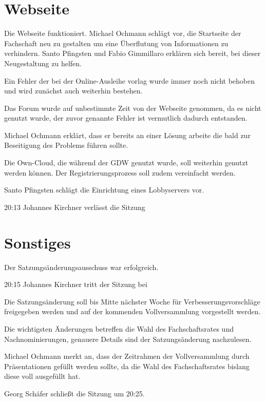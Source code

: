 \documentclass[a4paper, 11pt]{article} %
\begin{document}
\section{Webseite}
Die Webseite funktioniert.
Michael Ochmann schlägt vor, die Startseite der Fachschaft neu zu gestalten um eine Überflutung von Informationen zu verhindern. Santo Pfingsten und Fabio Gimmillaro erklären sich bereit, bei dieser Neugestaltung zu helfen.

Ein Fehler der bei der Online-Ausleihe vorlag wurde immer noch nicht behoben und wird zunächst auch weiterhin bestehen.

Das Forum wurde auf unbestimmte Zeit  von der Webseite genommen, da es nicht genutzt wurde, der zuvor genannte Fehler ist vermutlich dadurch entstanden.

Michael Ochmann erklärt, dass er bereits an einer Lösung arbeite die bald zur Beseitigung des Problems führen sollte.

Die Own-Cloud, die während der GDW genutzt wurde, soll weiterhin genutzt werden können.  Der Registrierungsprozess soll zudem vereinfacht werden.

Santo Pfingsten schlägt die Einrichtung eines Lobbyservers vor.

20:13 Johannes Kirchner verlässt die Sitzung
\pagebreak
\section{Sonstiges}

Der Satzungsänderungsausschuss war erfolgreich.

20:15 Johannes Kirchner tritt der Sitzung bei

Die Satzungsänderung soll bis  Mitte nächster Woche für Verbesserungsvorschläge freigegeben werden und auf der kommenden Vollversammlung vorgestellt werden.

Die wichtigsten Änderungen betreffen die Wahl des Fachschaftsrates und Nachnominierungen, genauere Details sind der Satzungsänderung nachzulesen.

Michael Ochmann merkt an, dass der Zeitrahmen der Vollversammlung durch Präsentationen gefüllt werden sollte, da die Wahl des Fachschaftsrates bislang diese voll ausgefüllt hat.

Georg Schäfer schließt die Sitzung um 20:25.






\end{document}
